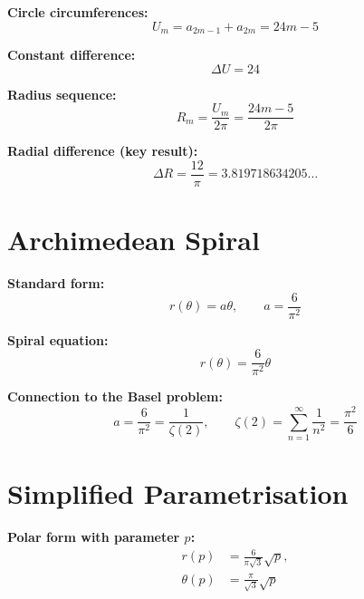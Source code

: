 \textbf{Circle circumferences:}
\begin{equation}
U_m = a_{2m-1} + a_{2m} = 24m - 5
\end{equation}

\textbf{Constant difference:}
\begin{equation}
\Delta U = 24
\end{equation}

\textbf{Radius sequence:}
\begin{equation}
R_m = \frac{U_m}{2\pi} = \frac{24m - 5}{2\pi}
\end{equation}

\textbf{Radial difference (key result):}
\begin{equation}
\boxed{
\Delta R = \frac{12}{\pi}
= 3.819718634205\ldots
}
\end{equation}

\section{Archimedean Spiral}

\textbf{Standard form:}
\begin{equation}
r(\theta) = a\theta,
\qquad
a = \frac{6}{\pi^2}
\end{equation}

\textbf{Spiral equation:}
\begin{equation}
\boxed{
r(\theta) = \frac{6}{\pi^2}\theta
}
\end{equation}

\textbf{Connection to the Basel problem:}
\begin{equation}
a = \frac{6}{\pi^2}
= \frac{1}{\zeta(2)},
\qquad
\zeta(2) = \sum_{n=1}^{\infty}\frac{1}{n^2} = \frac{\pi^2}{6}
\end{equation}

\section{Simplified Parametrisation}

\textbf{Polar form with parameter $p$:}
\begin{equation}
\boxed{
\begin{aligned}
r(p) &= \frac{6}{\pi\sqrt{3}}\sqrt{p}, \\[4pt]
\theta(p) &= \frac{\pi}{\sqrt{3}}\sqrt{p}
\end{aligned}
}
\end{equation}

